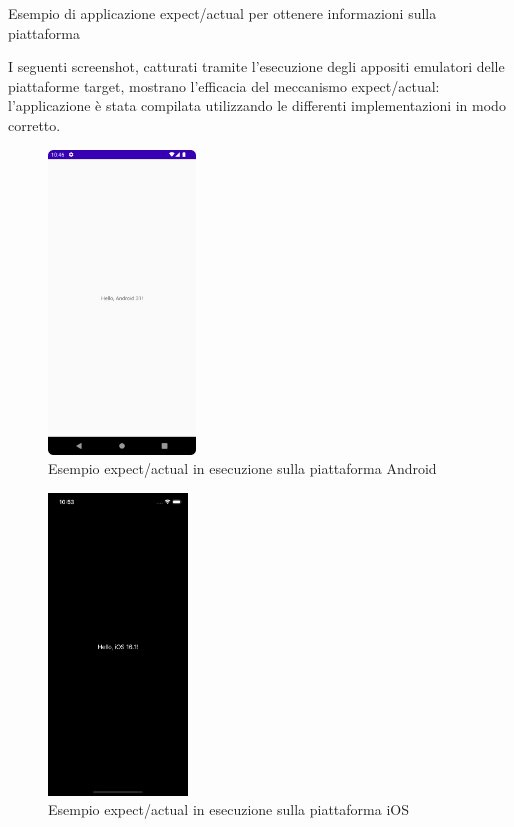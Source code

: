 \begin{listing}[H]
    \inputminted{kotlin}{code/expect-actual.kt}
    \caption{Esempio di applicazione expect/actual per ottenere informazioni sulla piattaforma}
\end{listing}

I seguenti screenshot, catturati tramite l'esecuzione degli appositi emulatori delle piattaforme target, mostrano l'efficacia del meccanismo expect/actual: l'applicazione è stata compilata utilizzando le differenti implementazioni in modo corretto.

\begin{multicols}{2}
    \begin{figure}[H]
        \centering
        \includegraphics[width=0.35\textwidth]{img/kmm_example_android.png}
        \caption{Esempio expect/actual in esecuzione sulla piattaforma Android}
        \label{expect-actual-android}
    \end{figure}

    \begin{figure}[H]
        \centering
        \includegraphics[width=0.33\textwidth]{img/kmm_example_ios_dark.png}
        \caption{Esempio expect/actual in esecuzione sulla piattaforma iOS}
        \label{expect-actual-ios}
    \end{figure}
\end{multicols}

